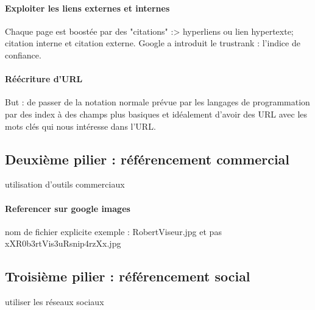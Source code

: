 \documentclass[10pt,a4paper]{article}
\begin{document}
\paragraph{Exploiter les liens externes et internes}
Chaque page est boostée par des "citations" :> hyperliens ou lien hypertexte; citation interne et citation externe. Google a introduit le trustrank : l'indice de confiance.
\paragraph{Réécriture d'URL}
But : de passer de la notation normale prévue par les langages de programmation par des index à des champs plus basiques et idéalement d'avoir des URL avec les mots clés qui nous intéresse dans l'URL. 

\subsection{Deuxième pilier : référencement commercial}
utilisation d'outils commerciaux
\paragraph{Referencer sur google images}
nom de fichier explicite exemple : RobertViseur.jpg et pas xXR0b3rtVis3uRsnip4rzXx.jpg \\

\subsection{Troisième pilier : référencement social}
utiliser les réseaux sociaux
\end{document}
